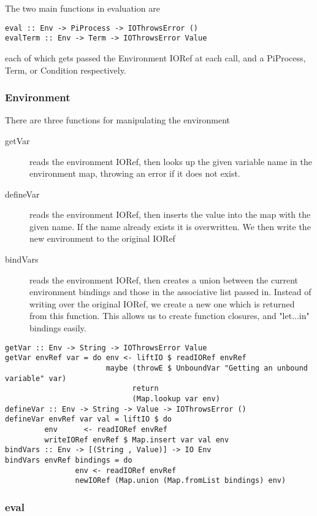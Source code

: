 The two main functions in evaluation are

\begin{verbatim}
eval :: Env -> PiProcess -> IOThrowsError () 
evalTerm :: Env -> Term -> IOThrowsError Value
\end{verbatim}

each of which gets passed the Environment IORef at each call, and a PiProcess, Term, or Condition respectively.

\subsubsection{Environment}

There are three functions for manipulating the environment
\begin{description}
    \item[getVar] reads the environment IORef, then looks up the given variable name in the environment map, throwing an error if it does not exist.
    \item[defineVar] reads the environment IORef, then inserts the value into the map with the given name. If the name already exists it is overwritten. We then write the new environment to the original IORef
    \item[bindVars] reads the environment IORef, then creates a union between the current environment bindings and those in the associative list passed in. Instead of writing over the original IORef, we create a new one which is returned from this function. This allows us to create function closures, and "let...in" bindings easily.
\end{description}
\begin{verbatim}
getVar :: Env -> String -> IOThrowsError Value 
getVar envRef var = do env <- liftIO $ readIORef envRef
                       maybe (throwE $ UnboundVar "Getting an unbound variable" var)
                             return
                             (Map.lookup var env)
defineVar :: Env -> String -> Value -> IOThrowsError ()
defineVar envRef var val = liftIO $ do
         env      <- readIORef envRef
         writeIORef envRef $ Map.insert var val env
bindVars :: Env -> [(String , Value)] -> IO Env
bindVars envRef bindings = do
                env <- readIORef envRef
                newIORef (Map.union (Map.fromList bindings) env)
\end{verbatim}


\subsubsection{eval}

